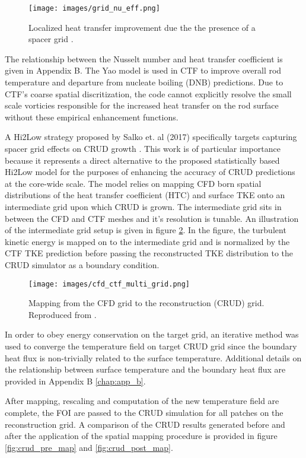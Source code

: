 \begin{figure}[!htbp]
\centering
\texttt{[image: images/grid\_nu\_eff.png]}
\caption{Localized heat transfer improvement due the the presence of a spacer grid \cite{salko17}.}
\label{fig:yao_nu}
\end{figure}

The relationship between the Nusselt number and heat transfer coefficient is given in Appendix B.
The Yao model is used in CTF to improve overall rod temperature and departure from nucleate boiling (DNB) predictions.  Due to CTF's coarse spatial discritization, the code cannot explicitly resolve the small scale vorticies responsible for the increased heat transfer on the rod surface without these empirical enhancement functions.   

A Hi2Low strategy proposed by Salko et. al (2017) specifically targets capturing spacer grid effects on CRUD growth \cite{salko17}.  This work is of particular importance because it represents a direct alternative to the proposed statistically based Hi2Low model for the purposes of enhancing the accuracy of CRUD predictions at the core-wide scale.  The model relies on mapping CFD born spatial distributions of the heat transfer coefficient (HTC) and surface TKE onto an intermediate grid upon which CRUD is grown.  The intermediate grid sits in between the CFD and CTF meshes and it's resolution is tunable.  An illustration of the intermediate grid setup is given in figure \ref{fig:cfd2ctf_map}.  In the figure, the turbulent kinetic energy is mapped on to the intermediate grid and is normalized by the CTF TKE prediction before passing the reconstructed TKE distribution to the CRUD simulator as a boundary condition. 

\begin{figure}[!htbp]
\centering
\texttt{[image: images/cfd\_ctf\_multi\_grid.png]}
\caption{Mapping from the CFD grid to the reconstruction (CRUD) grid.  Reproduced from \cite{salko17}.}
\label{fig:cfd2ctf_map}
\end{figure}

In order to obey energy conservation on the target grid,  an iterative method was used to converge the temperature field on target CRUD grid since the boundary heat flux is non-trivially related to the surface temperature.  Additional details on the relationship between surface temperature and the boundary heat flux are provided in Appendix B \ref{chap:app_b}.

After mapping, rescaling and computation of the new temperature field are complete, the FOI are passed to the CRUD simulation for all patches on the reconstruction grid.  A comparison of the CRUD results generated before and after the application of the spatial mapping procedure is provided in figure \ref{fig:crud_pre_map} and \ref{fig:crud_post_map}.

